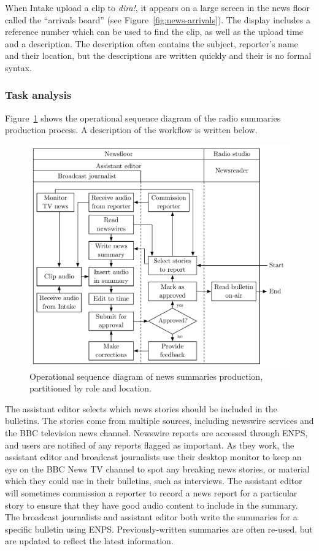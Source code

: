 When Intake upload a clip to \textit{dira!}, it appears on a large screen in the news floor called the ``arrivals
board'' (see Figure~\ref{fig:news-arrivals}). The display includes a reference number which can be used to find the
clip, as well as the upload time and a description. The description often contains the subject, reporter's name and
their location, but the descriptions are written quickly and their is no formal syntax.

\subsubsection{Task analysis}
Figure~\ref{fig:news-flowchart} shows the operational sequence diagram of the radio summaries production process. A
description of the workflow is written below.

\begin{figure}
	\centering
	\includegraphics[width=.9\columnwidth]{figs/news-workflow.pdf}
  \caption{Operational sequence diagram of news summaries production, partitioned by role and location.}
	\label{fig:news-flowchart}
\end{figure}

The assistant editor selects which news stories should be included in the bulletins. The stories come from multiple
sources, including newswire services and the BBC television news channel.
Newswire
reports are accessed through ENPS, and users are notified of any reports flagged as important.  As they work, the
assistant editor and broadcast journalists use their desktop monitor to keep an eye on the BBC News TV channel to spot
any breaking news stories, or material which they could use in their bulletins, such as interviews.  The assistant
editor will sometimes commission a reporter to record a news report for a particular story to ensure that they have
good audio content to include in the summary. The broadcast journalists and assistant editor both write the
summaries for a specific bulletin using ENPS. Previously-written summaries are often re-used, but are updated to
reflect the latest information.

